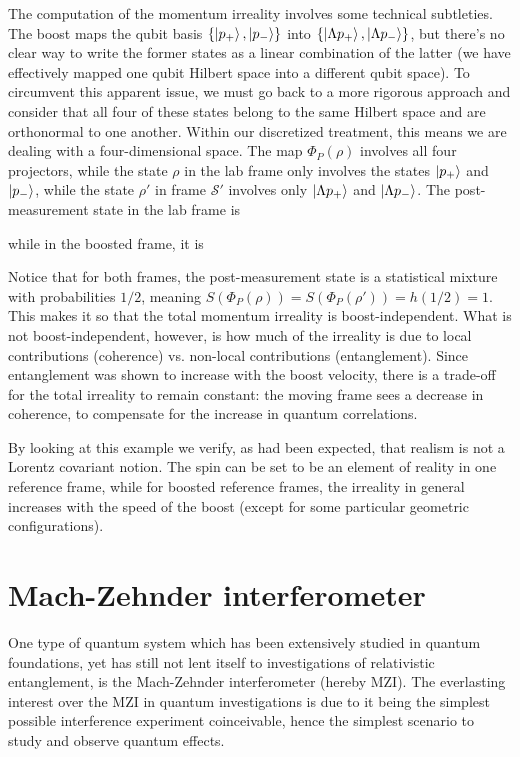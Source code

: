 \documentclass[12pt,a4paper,notitlepage]{report}
\begin{document}
The computation of the momentum irreality involves some technical subtleties. The boost maps the qubit basis $\{ \ket{p_+}, \ket{p_-} \}$ into $\{ \ket{\Lambda p_+}, \ket{\Lambda p_-} \}$, but there's no clear way to write the former states as a linear combination of the latter (we have effectively mapped one qubit Hilbert space into a different qubit space). To circumvent this apparent issue, we must go back to a more rigorous approach and consider that all four of these states belong to the same Hilbert space and are orthonormal to one another. Within our discretized treatment, this means we are dealing with a four-dimensional space. The map $\Phi_P(\rho)$ involves all four projectors, while the state $\rho$ in the lab frame only involves the states $\ket{p_+}$ and $\ket{p_-}$, while the state $\rho'$ in frame $\mathcal{S}'$ involves only $\ket{\Lambda p_+}$ and $\ket{\Lambda p_-}$. The post-measurement state in the lab frame is

%
while in the boosted frame, it is

%
Notice that for both frames, the post-measurement state is a statistical mixture with probabilities $1/2$, meaning $S(\Phi_P(\rho)) = S(\Phi_P(\rho')) = h(1/2) = 1$. This makes it so that the total momentum irreality is boost-independent. What is not boost-independent, however, is how much of the irreality is due to local contributions (coherence) vs. non-local contributions (entanglement). Since entanglement was shown to increase with the boost velocity, there is a trade-off for the total irreality to remain constant: the moving frame sees a decrease in coherence, to compensate for the increase in quantum correlations.

By looking at this example we verify, as had been expected, that realism is not a Lorentz covariant notion. The spin can be set to be an element of reality in one reference frame, while for boosted reference frames, the irreality in general increases with the speed of the boost (except for some particular geometric configurations).

\section{Mach-Zehnder interferometer}

One type of quantum system which has been extensively studied in quantum foundations, yet has still not lent itself to investigations of relativistic entanglement, is the Mach-Zehnder interferometer (hereby MZI). The everlasting interest over the MZI in quantum investigations is due to it being the simplest possible interference experiment coinceivable, hence the simplest scenario to study and observe quantum effects.
\end{document}
